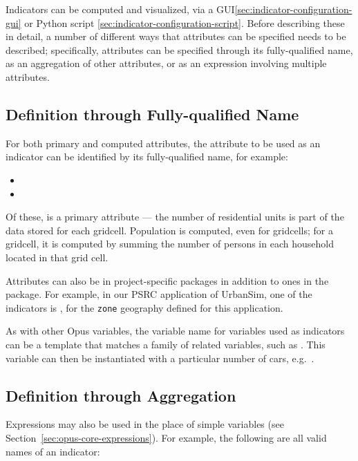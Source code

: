 Indicators can be computed and visualized, via a
GUI\ref{sec:indicator-configuration-gui} or Python script
\ref{sec:indicator-configuration-script}. Before describing these in detail, 
a number of different ways that attributes can be specified needs to be
described; specifically, attributes can be specified through its
fully-qualified name, as an aggregation of other attributes, or as an expression
involving multiple attributes. 

\subsection{Definition through Fully-qualified Name}

For both primary \primaryattributesindex and computed attributes,
\computedattributesindex the attribute \attributesindex to be used as an
indicator \indicatorsindex can be identified by its fully-qualified name,
for example:

\begin{itemize}
\tight
\item {}
\item {}
\end{itemize}

Of these,  is a
primary \primaryattributesindex attribute --- the number of residential
units is part of the data stored for each gridcell. 
\computedattributesindex Population is computed, even for
gridcells; for a gridcell, it is computed by summing the number of
persons in each household located in that grid cell. 

Attributes \attributesindex can also be in project-specific packages in
addition to ones in the  package.  For example, in our
PSRC \psrcindex application of UrbanSim, one of the indicators
\indicatorsindex is
, for the
\verb|zone| geography defined for this application.

As with other Opus variables, \variablesindex the variable \variablesindex
name for variables \variablesindex used as indicators \indicatorsindex can
be a template that matches a family of related variables, \variablesindex
such as .  This variable
\variablesindex can then be instantiated with a particular number of cars,
e.g.\ .
\subsection{Definition through Aggregation}
Expressions may also be used in the place of simple variables 
(see Section~\ref{sec:opus-core-expressions}). For example, the following are
all valid names of an indicator: 

